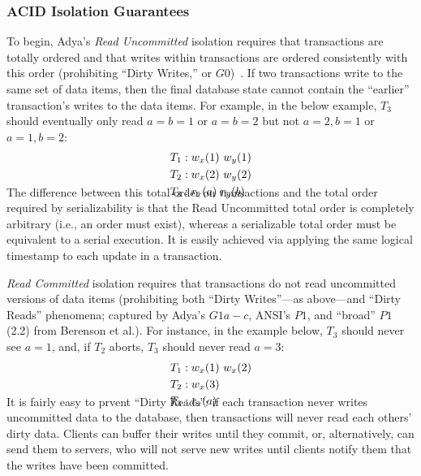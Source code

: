 \subsubsection{ACID Isolation Guarantees}

To begin, Adya's \textit{Read Uncommitted} isolation requires that
transactions are totally ordered and that writes within transactions
are ordered consistently with this order (prohibiting ``Dirty
Writes,'' or $G0$)~\cite{adya}. If two transactions write to the same
set of data items, then the final database state cannot contain the
``earlier'' transaction's writes to the data items. For example, in
the below example, $T_3$ should eventually only read $a=b=1$ or
$a=b=2$ but not $a=2, b=1$ or $a=1, b=2$:
\begin{align*}
\small
T_1 &: w_x(1)~w_y(1)
\\T_2 &: w_x(2)~w_y(2)
\\T_3 &: r_x(a)~r_y(b)\\[-2em]
\end{align*}
The difference between this total order on transactions and the total
order required by serializability is that the Read Uncommitted total
order is completely arbitrary (i.e., an order must exist), whereas a
serializable total order must be equivalent to a serial execution. It
is easily achieved via applying the same logical timestamp to each
update in a transaction.

\textit{Read Committed} isolation requires that transactions do not
read uncommitted versions of data items (prohibiting both ``Dirty
Writes''---as above---and ``Dirty Reads'' phenomena; captured by
Adya's $G1a-c$, ANSI's $P1$, and ``broad'' $P1$ (2.2) from Berenson et
al.). For instance, in the example below, $T_3$ should never see
$a=1$, and, if $T_2$ aborts, $T_3$ should never read $a=3$:
\vspace{-.5em}
\begin{align*}
\small
T_1 &: w_x(1)~w_x(2)
\\T_2 &: w_x(3)\\
T_3 &: r_x(a)\\[-2em]
\end{align*}
It is fairly easy to prvent ``Dirty Reads'': if each transaction never
writes uncommitted data to the database, then transactions will never
read each others' dirty data. Clients can buffer their writes until
they commit, or, alternatively, can send them to servers, who will not
serve new writes until clients notify them that the writes have been
committed.

